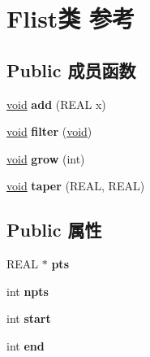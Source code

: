 \hypertarget{class_flist}{}\section{Flist类 参考}
\label{class_flist}
\subsection*{Public 成员函数}
\begin{DoxyCompactItemize}
\item 
\mbox{\label{class_flist_ab1b8fb9d26db8b210990e750e4c7a497}} 
\hyperlink{interfacevoid}{void} {\bfseries add} (R\+E\+AL x)
\item 
\mbox{\label{class_flist_a57aed6a05de5b1c651ea8ab9638a1896}} 
\hyperlink{interfacevoid}{void} {\bfseries filter} (\hyperlink{interfacevoid}{void})
\item 
\mbox{\label{class_flist_a7ae321bec4ba75c9bec45201a8fdea8c}} 
\hyperlink{interfacevoid}{void} {\bfseries grow} (int)
\item 
\mbox{\label{class_flist_ae256056c3375e2543a8dfd74a1929160}} 
\hyperlink{interfacevoid}{void} {\bfseries taper} (R\+E\+AL, R\+E\+AL)
\end{DoxyCompactItemize}
\subsection*{Public 属性}
\begin{DoxyCompactItemize}
\item 
\mbox{\label{class_flist_a0996a15203db62cd276746e7acf1a8b0}} 
R\+E\+AL $\ast$ {\bfseries pts}
\item 
\mbox{\label{class_flist_ac836b23b1d407f14874d4e09168fd300}} 
int {\bfseries npts}
\item 
\mbox{\label{class_flist_a0eb49cff8a39b26dcec94778c2e5c981}} 
int {\bfseries start}
\item 
\mbox{\label{class_flist_a66cf4c42979ceac727230db8bafe0b14}} 
int {\bfseries end}
\end{DoxyCompactItemize}
